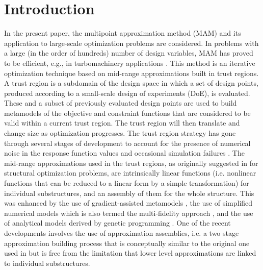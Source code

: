 \documentclass[a4paper]{llncs}
\begin{document}
\section{Introduction}

In the present paper, the multipoint approximation method (MAM)
\cite{Toropov1989,Toropov1992,ToropovFilatov1993} and its application to
large-scale optimization problems are considered. In problems with a large (in
the order of hundreds) number of design variables, MAM has proved to be
efficient, e.g., in turbomachinery applications
\cite{ShahparPolynkinToropov2008,PolynkinToropovShahpar2008,PolynkinToropovShahpar2010}.
This method is an iterative optimization technique based on mid-range
approximations built in trust regions. A trust region is a subdomain of the
design space in which a set of design points, produced according to a
small-scale design of experiments (DoE), is evaluated. These and a subset of
previously evaluated design points are used to build metamodels of the
objective and constraint functions that are considered to be valid within a
current trust region. The trust region will then translate and change size as
optimization progresses. The trust region strategy has gone through several
stages of development to account for the presence of numerical noise in the
response function values
\cite{KeulenToropovMarkine1996,ToropovKeulenMarkine1996} and occasional
simulation failures \cite{ToropovMarkineHolden1999}. The mid-range
approximations used in the trust regions, as originally suggested in
\cite{Toropov1989} for structural optimization problems, are intrinsically
linear functions (i.e. nonlinear functions that can be reduced to a linear form
by a simple transformation) for individual substructures, and an assembly of them
for the whole structure. This was enhanced by the use of gradient-assisted
metamodels \cite{ToropovFilatov1993}, the use of simplified numerical models
which is also termed the multi-fidelity approach \cite{ToropovMarkine1996}, and
the use of analytical models derived by genetic programming
\cite{ToropovAlvarez1998}. One of the recent developments
\cite{PolynkinToropov2012} involves the use of approximation assemblies, i.e. a
two stage approximation building process that is conceptually similar to the
original one used in \cite{Toropov1989} but is free from the limitation that
lower level approximations are linked to individual substructures.
\end{document}
